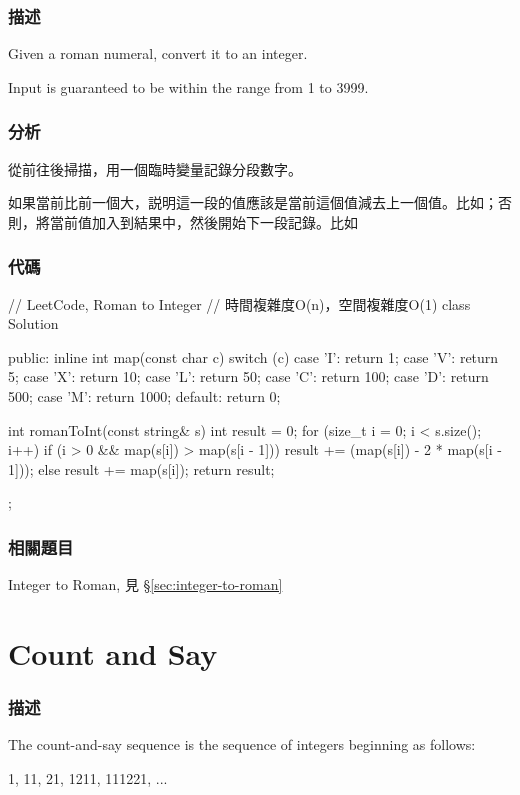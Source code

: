 \subsubsection{描述}
Given a roman numeral, convert it to an integer.

Input is guaranteed to be within the range from 1 to 3999.


\subsubsection{分析}
從前往後掃描，用一個臨時變量記錄分段數字。

如果當前比前一個大，説明這一段的值應該是當前這個值減去上一個值。比如；否則，將當前值加入到結果中，然後開始下一段記錄。比如


\subsubsection{代碼}
\begin{Code}
// LeetCode, Roman to Integer
// 時間複雜度O(n)，空間複雜度O(1)
class Solution {
public:
    inline int map(const char c) {
        switch (c) {
        case 'I': return 1;
        case 'V': return 5;
        case 'X': return 10;
        case 'L': return 50;
        case 'C': return 100;
        case 'D': return 500;
        case 'M': return 1000;
        default: return 0;
        }
    }

    int romanToInt(const string& s) {
        int result = 0;
        for (size_t i = 0; i < s.size(); i++) {
            if (i > 0 && map(s[i]) > map(s[i - 1])) {
                result += (map(s[i]) - 2 * map(s[i - 1]));
            } else {
                result += map(s[i]);
            }
        }
        return result;
    }
};
\end{Code}


\subsubsection{相關題目}
\begindot
\item Integer to Roman, 見 \S \ref{sec:integer-to-roman}
\myenddot


\section{Count and Say} %
\label{sec:count-and-say}


\subsubsection{描述}
The count-and-say sequence is the sequence of integers beginning as follows:
\begin{Code}
1, 11, 21, 1211, 111221, ...
\end{Code}


